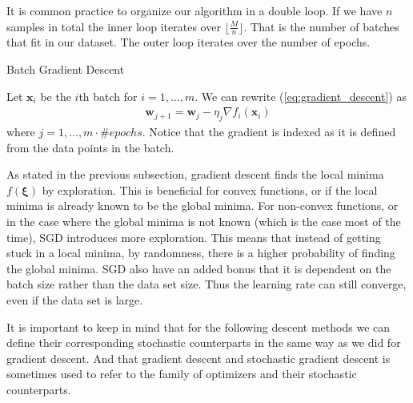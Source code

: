 \documentclass{article}
\theoremstyle{definition}
\begin{document}
It is common practice to organize our algorithm in a double loop. If we have $n$ samples in total the inner loop iterates over $\lfloor\frac{M}{n} \rfloor$. That is the number of batches that fit in our dataset. The outer loop iterates over the number of epochs.

\newpage

\begin{algorithm}[hbt!]
\caption{Batch Gradient Descent}\label{alg:SGD}
\end{algorithm}
 
Let $\boldsymbol{x}_i$ be the $i$th batch for $i=1, \ldots, m$. We can rewrite (\ref{eq:gradient_descent}) as
\begin{align*}
        \boldsymbol{w}_{j+1} = \boldsymbol{w}_j - \eta_j\nabla f_i (\boldsymbol{x}_i)
\end{align*}
where $j=1,...,m \cdot \#epochs$. Notice that the gradient is indexed as it is defined from the data points in the batch.

As stated in the previous subsection, gradient descent finds the local minima $f(\boldsymbol{\xi})$ by exploration. This is beneficial for convex functions, or if the local minima is already known to be the global minima. For non-convex functions, or in the case where the global minima is not known (which is the case most of the time), SGD introduces more exploration. This means that instead of getting stuck in a local minima, by randomness, there is a higher probability of finding the global minima. SGD also have an added bonus that it is dependent on the batch size rather than the data set size. Thus the learning rate can still converge, even if the data set is large.

It is important to keep in mind that for the following descent methods we can define their corresponding stochastic counterparts in the same way as we did for gradient descent. And that gradient descent and stochastic gradient descent is sometimes used to refer to the family of optimizers and their stochastic counterparts.
\end{document}

